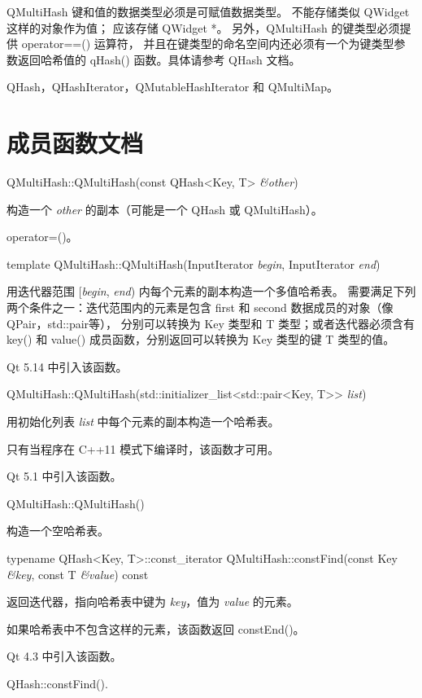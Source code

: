 QMultiHash 键和值的数据类型必须是可赋值数据类型。
不能存储类似 QWidget 这样的对象作为值；
应该存储 QWidget *。
另外，QMultiHash 的键类型必须提供 operator==() 运算符， 
并且在键类型的命名空间内还必须有一个为键类型参数返回哈希值的 qHash() 函数。具体请参考 QHash 文档。

\begin{seeAlso}
QHash，QHashIterator，QMutableHashIterator 和 QMultiMap。
\end{seeAlso}

\section{成员函数文档}

QMultiHash::QMultiHash(const QHash<Key, T> \emph{\&other})

构造一个 \emph{other} 的副本（可能是一个 QHash 或 QMultiHash）。

\begin{seeAlso}
operator=()。
\end{seeAlso}

template QMultiHash::QMultiHash(InputIterator \emph{begin}, InputIterator \emph{end})

用迭代器范围 [\emph{begin}, \emph{end}) 内每个元素的副本构造一个多值哈希表。
需要满足下列两个条件之一：迭代范围内的元素是包含 first 和 second 数据成员的对象（像 QPair，std::pair等），
分别可以转换为 Key 类型和 T 类型；或者迭代器必须含有 key() 和 value() 成员函数，分别返回可以转换为 Key 类型的键 T 类型的值。

Qt 5.14 中引入该函数。

QMultiHash::QMultiHash(std::initializer\_list<std::pair<Key, T>> \emph{list})

用初始化列表 \emph{list} 中每个元素的副本构造一个哈希表。

只有当程序在 C++11 模式下编译时，该函数才可用。

Qt 5.1 中引入该函数。

QMultiHash::QMultiHash()

构造一个空哈希表。

typename QHash<Key, T>::const\_iterator QMultiHash::constFind(const Key \emph{\&key}, const T \emph{\&value}) const

返回迭代器，指向哈希表中键为 \emph{key}，值为 \emph{value} 的元素。

如果哈希表中不包含这样的元素，该函数返回 constEnd()。

Qt 4.3 中引入该函数。

\begin{seeAlso}
QHash::constFind().
\end{seeAlso}

